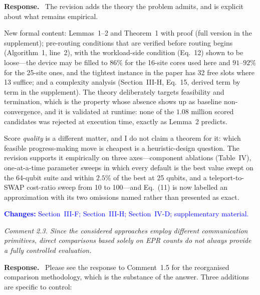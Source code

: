 \documentclass[11pt]{article}
\newenvironment{comment}{\medskip\noindent\itshape}{\par}
\newcommand{\response}{\smallskip\noindent\textbf{Response.}\ }
\newcommand{\where}[1]{\textcolor{blue}{\textbf{Changes:} #1}}
\begin{document}
\response
The revision adds the theory the problem admits, and is explicit about what
remains empirical.

New formal content: Lemmas~1--2 and Theorem~1 with proof (full version in the
supplement); pre-routing conditions that are verified before routing begins
(Algorithm~1, line~2), with the workload-side condition (Eq.~12) shown to be
loose---the device may be filled to $86\%$ for the 16-site cores used here and
$91$--$92\%$ for the 25-site ones, and the tightest instance in the paper has
32 free slots where 13 suffice; and a complexity analysis
(Section~III-H, Eq.~15, derived term by term in the supplement). The theory deliberately targets feasibility and termination,
which is the property whose absence shows up as baseline non-convergence, and
it is validated at runtime: none of the $1.08$ million scored candidates was
rejected at execution time, exactly as Lemma~2 predicts.

Score \emph{quality} is a different matter, and I do not claim a theorem for
it: which feasible progress-making move is cheapest is a heuristic-design
question. The revision supports it empirically on three axes---component
ablations (Table~IV), one-at-a-time parameter sweeps in which every default is
the best value swept on the 64-qubit suite and within $2.5\%$ of the best at
25 qubits, and a teleport-to-SWAP cost-ratio sweep from 10 to 100---and
Eq.~(11) is now labelled an approximation with its two omissions named rather
than presented as exact.

\where{Section~III-F; Section~III-H; Section~IV-D; supplementary material.}

\begin{comment}
Comment 2.3. Since the considered approaches employ different communication
primitives, direct comparisons based solely on EPR counts do not always
provide a fully controlled evaluation.
\end{comment}

\response
Please see the response to Comment~1.5 for the reorganised comparison
methodology, which is the substance of the answer. Three additions are
specific to control:
\end{document}
